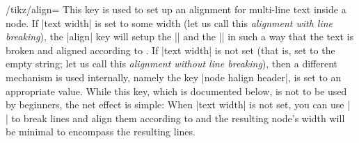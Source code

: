 \begin{key}{/tikz/align=}
    This key is used to set up an alignment for multi-line text inside a node.
    If |text width| is set to some width (let us call this \emph{alignment with
    line breaking}), the |align| key will setup the |\leftskip| and the
    |\rightskip| in such a way that the text is broken and aligned according to
    . If |text width| is not set (that is, set to the
    empty string; let us call this \emph{alignment without line breaking}),
    then a different mechanism is used internally, namely the key
    |node halign header|, is set to an appropriate value. While this key, which
    is documented below, is not to be used by beginners, the net effect is
    simple: When |text width| is not set, you can use |\\| to break lines and
    align them according to  and the resulting node's
    width will be minimal to encompass the resulting lines.


\end{key}
